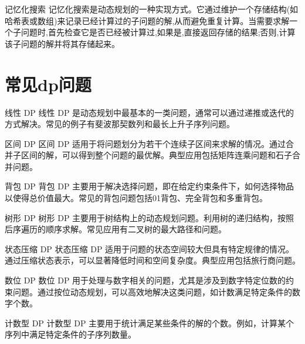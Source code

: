 \documentclass{beamer}
\begin{document}
\begin{frame}{记忆化搜索}
    记忆化搜索是动态规划的一种实现方式。它通过维护一个存储结构(如哈希表或数组)来记录已经计算过的子问题的解,从而避免重复计算。当需要求解一个子问题时,首先检查它是否已经被计算过,如果是,直接返回存储的结果;否则,计算该子问题的解并将其存储起来。
\end{frame}

\section{常见dp问题}

\begin{frame}{线性 DP}
    线性 DP 是动态规划中最基本的一类问题，通常可以通过递推或迭代的方式解决。常见的例子有斐波那契数列和最长上升子序列问题。
\end{frame}

\begin{frame}{区间 DP}
    区间 DP 适用于将问题划分为若干个连续子区间来求解的情况。通过合并子区间的解，可以得到整个问题的最优解。典型应用包括矩阵连乘问题和石子合并问题。
\end{frame}

\begin{frame}{背包 DP}
    背包 DP 主要用于解决选择问题，即在给定约束条件下，如何选择物品以使得总价值最大。常见的背包问题包括01背包、完全背包和多重背包。
\end{frame}

\begin{frame}{树形 DP}
    树形 DP 主要用于树结构上的动态规划问题。利用树的递归结构，按照后序遍历的顺序求解。常见应用有二叉树的最大路径和问题。
\end{frame}

\begin{frame}{状态压缩 DP}
    状态压缩 DP 适用于问题的状态空间较大但具有特定规律的情况。通过压缩状态表示，可以显著降低时间和空间复杂度。典型应用包括旅行商问题。
\end{frame}

\begin{frame}{数位 DP}
    数位 DP 用于处理与数字相关的问题，尤其是涉及到数字特定位数的约束问题。通过按位动态规划，可以高效地解决这类问题，如计数满足特定条件的数字个数。
\end{frame}

\begin{frame}{计数型 DP}
    计数型 DP 主要用于统计满足某些条件的解的个数。例如，计算某个序列中满足特定条件的子序列数量。
\end{frame}
\end{document}
